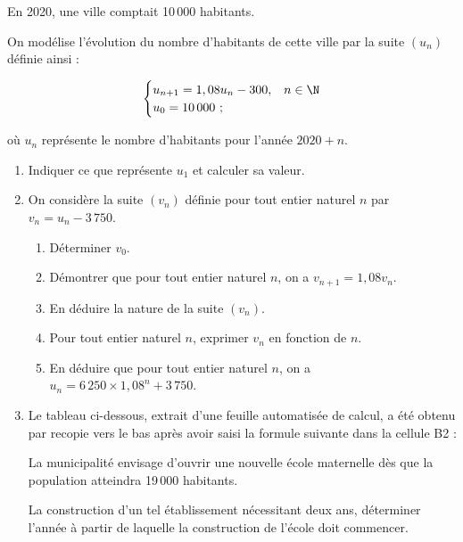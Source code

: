 En 2020, une ville comptait 10\,000 habitants.

On modélise l'évolution du nombre d'habitants de cette ville par la suite $(u_n)$ définie ainsi :

\[
\begin{cases}
u_{n+1} = 1,08u_n - 300, & n \in \N \\
u_0 = 10\,000~;
\end{cases}
\]

où $u_n$ représente le nombre d'habitants pour l'année $2020 + n$.

\begin{enumerate}
\item Indiquer ce que représente $u_1$ et calculer sa valeur.

\item On considère la suite $(v_n)$ définie pour tout entier naturel $n$ par $v_n = u_n - 3\,750$.
\begin{enumerate}
\item Déterminer $v_0$.
\item Démontrer que pour tout entier naturel $n$, on a $v_{n+1} = 1,08v_n$.
\item En déduire la nature de la suite $(v_n)$.
\item Pour tout entier naturel $n$, exprimer $v_n$ en fonction de $n$.
\item En déduire que pour tout entier naturel $n$, on a $u_n = 6\,250 \times 1,08^n + 3\,750$.
\end{enumerate}

\medskip

\item 

\begin{minipage}[t]{0.6\textwidth}
Le tableau ci-dessous, extrait d'une feuille automatisée de calcul, a été obtenu par recopie vers le bas après avoir saisi la formule suivante dans la cellule B2 :

\begin{center}
\end{center}

La municipalité envisage d'ouvrir une nouvelle école maternelle dès que la population atteindra 19\,000 habitants.

\medskip

La construction d'un tel établissement nécessitant deux ans, déterminer l'année à partir de laquelle la construction de l'école doit commencer.

\medskip


\end{minipage}
\end{enumerate}
